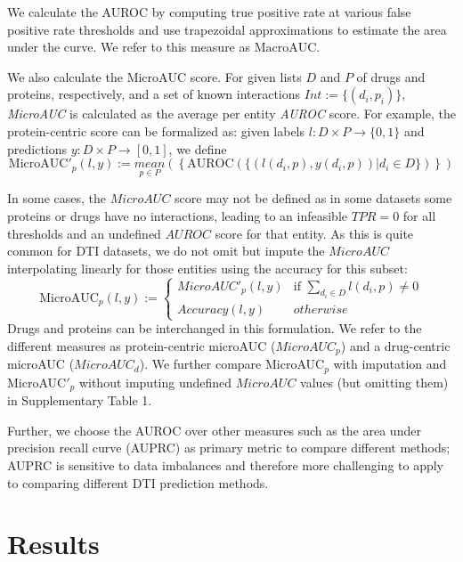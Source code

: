 \documentclass{bioinfo}
\renewcommand{\cite}{\citep}
\begin{document}
We calculate the AUROC by computing true positive rate at various
false positive rate thresholds and use trapezoidal approximations to
estimate the area under the curve. We refer to this measure as
$\textrm{MacroAUC}$.

We also calculate the $\textrm{MicroAUC}$ score. For given lists $D$
and $P$ of drugs and proteins, respectively, and a set of known
interactions $Int := \{(d_i, p_i) \}$, \textit{MicroAUC} is calculated
as the average per entity \textit{AUROC} score. For example, the
protein-centric score can be formalized as: given labels
$l:D\times P \rightarrow \{0,1\}$ and predictions
$y:D\times P \rightarrow [0,1]$, we define
\begin{equation*}
  \textrm{MicroAUC}'_p(l,y) := \underset{p\in P}{mean}\left(\left\{
      \text{AUROC}(\{ (l(d_i, p), y(d_i,p))| d_i\in D\})
    \right\}\right)
\end{equation*}

In some cases, the $MicroAUC$ score may not be defined as in some
datasets some proteins or drugs have no interactions, leading to an
infeasible $TPR=0$ for all thresholds and an undefined $AUROC$ score
for that entity. As this is quite common for DTI datasets, we do not
omit but impute the $MicroAUC$ interpolating linearly for those
entities using the accuracy for this subset:
\begin{equation*}
	\textrm{MicroAUC}_p(l,y) := 
	\begin{cases}
		MicroAUC'_p(l,y) & \text{if }\sum_{d_i\in
                  D}l(d_i,p)\neq 0\\
		Accuracy(l,y)&otherwise
	\end{cases}
\end{equation*}
Drugs and proteins can be interchanged in this formulation. We refer
to the different measures as protein-centric microAUC ($MicroAUC_p$)
and a drug-centric microAUC ($MicroAUC_d$).  We further compare
MicroAUC$_p$ with imputation and MicroAUC$'_p$ without imputing
undefined $MicroAUC$ values (but omitting them) in Supplementary Table
1.

Further, we choose the AUROC over other measures such as the area
under precision recall curve (AUPRC) as primary metric to compare
different methods; AUPRC is sensitive to data imbalances
\cite{Jeni2013} and therefore more challenging to apply to comparing
different DTI prediction methods.

\section{Results}
\end{document}
